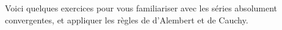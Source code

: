 % 
% 
% 
% 
% 
% 
% 
% 
% 
% 
% 
% 
% 
% 
% 
% 
% 
% 
% 
% 
% 
% 
% 
% 
% 
% 
% 
% 
% 
% 
% 
% 
% 
% 
% 

\diapo

Voici quelques exercices pour vous familiariser avec les séries absolument convergentes, et appliquer les règles de d'Alembert et de Cauchy.


